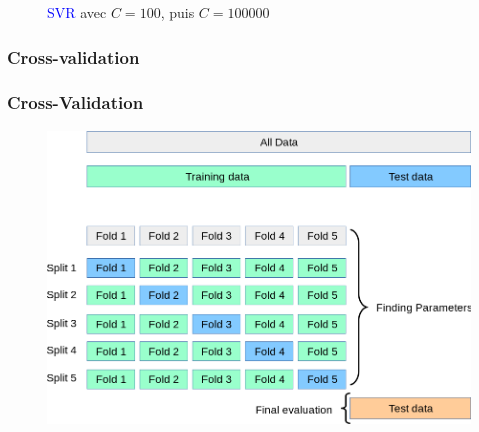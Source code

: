 \documentclass{beamer}[aspectratio = 43]
\begin{document}
\begin{frame}
\begin{figure}[h]
\begin{minipage}{0.5\textwidth}
		\end{minipage}
		\caption{\textcolor{blue}{SVR} avec $C=100$, puis $C=100000$}
	\end{figure}
\end{frame}

\subsubsection{Cross-validation}
\begin{frame}
	\frametitle{Cross-Validation}
	\begin{figure}[b]
		\centering
		\includegraphics[scale=0.3]{gscv}
	\end{figure}
\end{frame}
\end{document}
